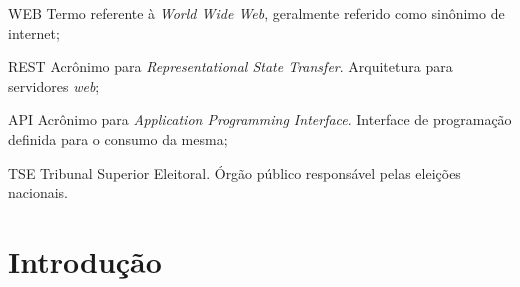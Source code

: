 \documentclass[
	12pt,				%
	oneside,			%
	a4paper,			%
	english,			%
	brazil				%
	]{abntex2ppgsi}
\begin{document}
\listoffigures*
\cleardoublepage

\listoftables*
\cleardoublepage

%
%
\begin{siglas}
  \item[WEB] Termo referente à \textit{World Wide Web}, geralmente referido como sinônimo de internet;
  \item[REST] Acrônimo para \textit{Representational State Transfer}. Arquitetura para servidores \textit{web};
  \item[API] Acrônimo para \textit{Application Programming Interface}. Interface de programação definida para o consumo da mesma;
  \item[TSE] Tribunal Superior Eleitoral. Órgão público responsável pelas eleições nacionais.
\end{siglas}


\tableofcontents*
\cleardoublepage

\textual



% 
%
%
\chapter{Introdução}
\label{sec:intro}
\end{document}
